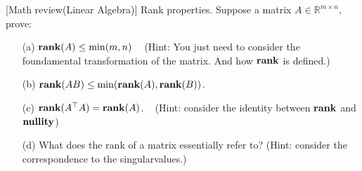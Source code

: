 \item {} [Math review(Linear Algebra)] Rank properties. Suppose a matrix $A\in \mathbb{R}^{m\times n}$, prove:
\begin{itemize}
    \item[(a)] $\mathop{\bf rank}(A)\leq \min(m, n)$ ~ (Hint: You just need to consider the foundamental transformation of the matrix. And how $\mathop{\bf rank}$ is defined.)
    \item[(b)] $\mathop{\bf rank}(AB)\leq \min(\mathop{\bf rank}(A),\mathop{\bf rank}(B))$. ~
    \item[(c)] $\mathop{\bf rank}(A^{\top}A)=\mathop{\bf rank}(A)$. ~ (Hint: consider the identity between $\mathop{\bf rank}$ and $\textbf{nullity}$)
    \item[(d)] What does the rank of a matrix essentially refer to? (Hint: consider the correspondence to the singularvalues.) ~
\end{itemize}

\solution







\newpage